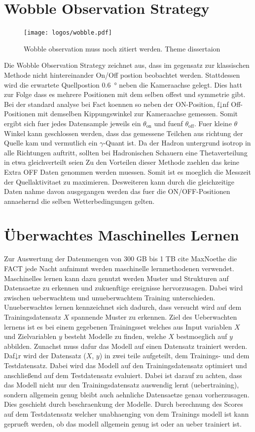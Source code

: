 \section{Wobble Observation Strategy}
\begin{figure}
  \texttt{[image: logos/wobble.pdf]}
  \caption{Wobble observation muss noch zitiert werden. Theme dissertaion}
\end{figure}
Die Wobble Observation Strategy zeichnet aus, dass im gegensatz zur klassischen Methode nicht hintereinander On/Off postion beobachtet werden. Stattdessen wird die erwartete Quellpostion \SI{0.6}{\degree} neben die Kameraachse gelegt. Dies hatt zur Folge dass es mehrere Positionen mit dem selben offest und symmetrie gibt. Bei der standard analyse bei Fact koennen so neben der ON-Position, f↓nf Off-Positionen mit demselben Kippungswinkel zur Kameraachse gemessen. Somit ergibt sich fuer jedes Datensample jeweils ein $\theta_\text{on}$ und fuenf $\theta_\text{off}$. Fuer kleine $\theta$ Winkel kann geschlossen werden, dass das gemessene Teilchen aus richtung der Quelle kam und vermutlich ein $\gamma$-Quant ist. Da der Hadron untergrund isotrop in alle Richtungen auftritt, sollten bei Hadronischen Schauern eine Thetaverteilung in etwa gleichverteilt seien  Zu den Vorteilen dieser Methode zaehlen das keine Extra OFF Daten genommen werden muessen. Somit ist es moeglich die Messzeit der Quellaktivitaet zu maximieren. Desweiteren kann durch die gleichzeitige Daten nahme davon ausgegangen werden das fuer die ON/OFF-Positionen annaehernd die selben Wetterbedingungen gelten. 

\section{Überwachtes Maschinelles Lernen}
Zur Auswertung der Datenmengen von 300 GB bis 1 TB cite MaxNoethe die FACT jede Nacht aufnimmt werden maschinelle lernmethodenen verwendet. Maschinelles lernen kann dazu genutzt werden Muster und Strukturen auf Datensaetze zu erkennen und zukuenftige ereignisse hervorzusagen. Dabei wird zwischen ueberwachtem und unueberwachtem Training unterschieden. Unueberwachtes lernen kennzeichnet sich dadurch, dass versucht wird auf dem Trainingsdatensatz $X$ spannende Muster zu erkennen.  Ziel des Ueberwachten lernens ist es bei einem gegebenen Trainingsset welches aus Input variablen $X$ und Zielvariablen $y$ besteht Modelle zu finden, welche $X$ bestmoeglich auf $y$ abbilden. \newline
Zunachst muss dafur das Modell auf einen Datensatz trainiert werden. Daf↓r wird der Datensatz ($X$, $y$) in zwei teile aufgeteilt, dem Trainings- und dem Testdatensatz. Dabei wird das Modell auf den Trainingsdatensatz optimiert und anschließend auf dem Testdatensatz evaluiert. Dabei ist darauf zu achten, dass das Modell nicht nur den Trainingsdatensatz auswendig lernt (uebertraining), sondern allgemein genug bleibt auch aehnliche Datensaetze genau vorherzusagen. Dies geschieht durch beschraenkung der Modelle. Durch berechnung des Scores auf dem Testdatensatz welcher unabhaenging von dem Trainings modell ist kann geprueft werden, ob das modell allgemein genug ist oder an ueber trainiert ist.
